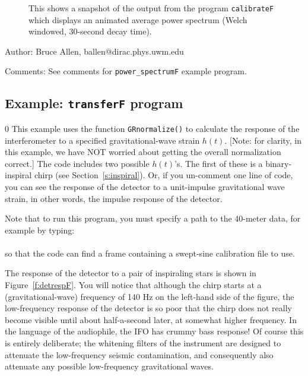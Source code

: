 \begin{figure}[hb]
\begin{center}
\caption{\label{f:calibrateF} 
This shows a snapshot of the output from the program {\tt calibrateF}
which displays an animated average power spectrum (Welch windowed, 30-second decay time).}
\end{center}
\end{figure}


\begin{description}
\item{Author:}
Bruce Allen, ballen@dirac.phys.uwm.edu
\item{Comments:}
See comments for {\tt power\_spectrumF} example program.
\end{description}
\clearpage

\subsection{Example: {\tt transferF} program}
\setcounter{equation}0
This example uses the function {\tt GRnormalize()} to calculate the
response of the interferometer to a specified gravitational-wave strain
$h(t)$. [Note: for clarity, in this example, we have NOT worried about
getting the overall normalization correct.] The code includes two
possible $h(t)$'s.  The first of these is a binary-inspiral chirp (see
Section~\ref{s:inspiral}).  Or, if you un-comment one line of code, you
can see the response of the detector to a unit-impulse gravitational
wave strain, in other words, the impulse response of the detector.

Note that to run this program, you must specify
a path to the 40-meter data, for example by typing:\\
\\ 
so that the code can find a frame containing a swept-sine calibration
file to use.

The response of the detector to a pair of inspiraling stars is shown in
Figure~\ref{f:detrespF}.  You will notice that although the chirp starts at
a (gravitational-wave) frequency of 140 Hz on the left-hand side of the
figure, the low-frequency response of the detector is so poor that the
chirp does not really become visible until about half-a-second later,
at somewhat higher frequency.  In the language of the audiophile, the
IFO has crummy bass response!  Of course this is entirely deliberate;
the whitening filters of the instrument are designed to attenuate the
low-frequency seismic contamination, and consequently also attenuate
any possible low-frequency gravitational waves.

